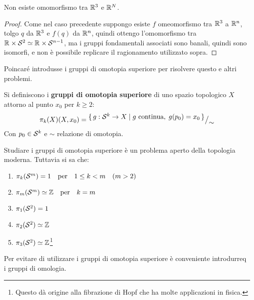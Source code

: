 \begin{proposition}
  Non esiste omomorfismo tra $ \mathbb{R}^{3} $ e $ \mathbb{R}^{N} $.
\end{proposition}

\begin{proof}
  Come nel caso precedente suppongo esiste $ f $ omeomorfismo tra $ \mathbb{R}^{3} $ a
  $ \mathbb{R}^{n} $, tolgo $ q $ da $ \mathbb{R}^{3} $ e $ f(q) $ da $ \mathbb{R}^{n} $, quindi ottengo
  l'omomorfismo tra $ \mathbb{R}^{} \times \mathcal{S}^{2} \simeq \mathbb{R}^{} \times \mathcal{S}^{n-1} $, ma i gruppi
  fondamentali associati sono banali, quindi sono isomorfi, e non è possibile
  replicare il ragionamento utilizzato sopra.
\end{proof}
\hfill \newline \newline \noindent
Poincaré introdusse i gruppi di  omotopia superiore per risolvere questo e altri problemi.
\begin{definition}
  Si definiscono i \textbf{gruppi di omotopia superiore} di uno spazio topologico $ X $
  attorno al punto $ x_0 $ per $ k \geq 2 $:
  \[
    \pi_k(X) (X, x_0) = {^{\textstyle \set{ g: \mathcal{S}^{k} \to X | g \text{ continua}, \; g(p_0) = x_0}}\big/_{\textstyle \sim}}
  \]
  Con $ p_0 \in \mathcal{S}^{k} $ e $ \sim $ relazione di omotopia.
\end{definition}
Studiare i gruppi di omotopia superiore è un problema aperto della topologia moderna.
Tuttavia si sa che:
\begin{enumerate}
\item $ \pi_k(\mathcal{S}^{m}) = 1 \quad \text{per} \quad 1 \leq k < m \quad (m > 2)$
\item $ \pi_m(\mathcal{S}^{m}) \simeq \mathbb{Z} \quad \text{per} \quad k = m $
\item $ \pi_1(\mathcal{S}^{2}) = 1 $
\item $ \pi_2(\mathcal{S}^{2}) \simeq \mathbb{Z} $
\item $ \pi_3(\mathcal{S}^{2}) \simeq \mathbb{Z} $\footnote[$\dagger$]{Questo dà origine alla fibrazione di Hopf che ha molte applicazioni in fisica.}
\end{enumerate}

Per evitare di utilizzare i gruppi di omotopia superiore è conveniente introdurreq i gruppi di omologia.


